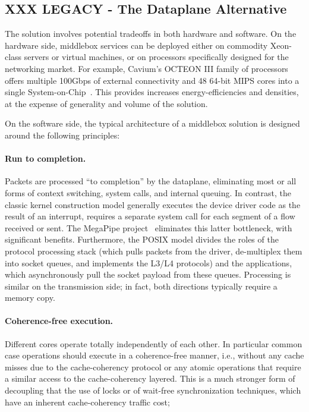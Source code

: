 \subsection{XXX LEGACY - The Dataplane Alternative}
\label{sec:motivation:dp}


The solution involves potential tradeoffs in both hardware and
software.  On the hardware side, middlebox services can be deployed
either on commodity Xeon-class servers or virtual machines, or on
processors specifically designed for the networking market.  For
example, Cavium's OCTEON III family of processors offers multiple
100Gbps of external connectivity and 48 64-bit MIPS cores into a
single System-on-Chip~\cite{cavium-octeon}.  This provides increases
energy-efficiencies and densities, at the expense of generality and
volume of the solution.  

On the software side, the typical architecture of a middlebox solution
is designed around the following principles: 

\paragraph{Run to completion.}  Packets are processed ``to
completion'' by the dataplane, eliminating most or all forms of
context switching, system calls, and internal queuing.  In contrast,
the classic kernel construction model generally executes the device
driver code as the result of an interrupt, requires a separate system
call for each segment of a flow received or sent.  The MegaPipe
project~\cite{han2012megapipe} eliminates this latter bottleneck, with
significant benefits.  Furthermore, the POSIX model divides the roles
of the protocol processing stack (which pulls packets from the driver,
de-multiplex them into socket queues, and implements the L3/L4
protocols) and the applications, which asynchronously pull the socket
payload from these queues.  Processing is similar on the transmission
side; in fact, both directions typically require a memory copy.

\paragraph{Coherence-free execution.} 
Different cores operate totally independently
of each other.  In particular common case operations should execute in
a coherence-free manner, i.e., without any cache misses due to the
cache-coherency protocol or any atomic operations that require a
similar access to the cache-coherency layered. This is a much stronger
form of decoupling that the use of locks or of wait-free
synchronization techniques, which have an inherent cache-coherency
traffic cost; 

